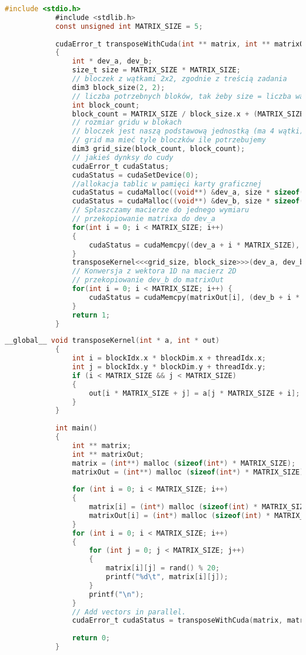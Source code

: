 			\begin{lstlisting}[language=C]
			#include <stdio.h>
			#include <stdlib.h>
			const unsigned int MATRIX_SIZE = 5;
			
			cudaError_t transposeWithCuda(int ** matrix, int ** matrixOut)
			{
				int * dev_a, dev_b;
				size_t size = MATRIX_SIZE * MATRIX_SIZE;
				// bloczek z wątkami 2x2, zgodnie z treścią zadania
				dim3 block_size(2, 2);
				// liczba potrzebnych bloków, tak żeby size = liczba wątków
				int block_count;
				block_count = MATRIX_SIZE / block_size.x + (MATRIX_SIZE % block_size.x == 0 ? 0 : 1);
				// rozmiar gridu w blokach
				// bloczek jest naszą podstawową jednostką (ma 4 wątki)
				// grid ma mieć tyle bloczków ile potrzebujemy
				dim3 grid_size(block_count, block_count);
				// jakieś dynksy do cudy
				cudaError_t cudaStatus;
				cudaStatus = cudaSetDevice(0);
				//allokacja tablic w pamięci karty graficznej
				cudaStatus = cudaMalloc((void**) &dev_a, size * sizeof(int));
				cudaStatus = cudaMalloc((void**) &dev_b, size * sizeof(int));
				// Spłaszczamy macierze do jednego wymiaru
				// przekopiowanie matrixa do dev_a
				for(int i = 0; i < MATRIX_SIZE; i++)
				{
					cudaStatus = cudaMemcpy((dev_a + i * MATRIX_SIZE), matrix[i], MATRIX_SIZE * sizeof(int), cudaMemcpyHostToDevice);
				}
				transposeKernel<<<grid_size, block_size>>>(dev_a, dev_b);
				// Konwersja z wektora 1D na macierz 2D
				// przekopiowanie dev_b do matrixOut
				for(int i = 0; i < MATRIX_SIZE; i++) {
					cudaStatus = cudaMemcpy(matrixOut[i], (dev_b + i * MATRIX_SIZE), MATRIX_SIZE * sizeof(int), cudaMemcpyDeviceToHost);
				}
				return 1;
			}
			\end{lstlisting}
			\begin{lstlisting}[language=C]
			__global__ void transposeKernel(int * a, int * out)
			{
				int i = blockIdx.x * blockDim.x + threadIdx.x;
				int j = blockIdx.y * blockDim.y + threadIdx.y;
				if (i < MATRIX_SIZE && j < MATRIX_SIZE)
				{
					out[i * MATRIX_SIZE + j] = a[j * MATRIX_SIZE + i];
				}
			}
			
			int main()
			{
				int ** matrix;
				int ** matrixOut;
				matrix = (int**) malloc (sizeof(int*) * MATRIX_SIZE);
				matrixOut = (int**) malloc (sizeof(int*) * MATRIX_SIZE);
				
				for (int i = 0; i < MATRIX_SIZE; i++)
				{
					matrix[i] = (int*) malloc (sizeof(int) * MATRIX_SIZE);
					matrixOut[i] = (int*) malloc (sizeof(int) * MATRIX_SIZE);
				}
				for (int i = 0; i < MATRIX_SIZE; i++)
				{
					for (int j = 0; j < MATRIX_SIZE; j++)
					{
						matrix[i][j] = rand() % 20;
						printf("%d\t", matrix[i][j]);
					}
					printf("\n");
				}
				// Add vectors in parallel.
				cudaError_t cudaStatus = transposeWithCuda(matrix, matrixOut);
				
				return 0;
			}
			
			\end{lstlisting}